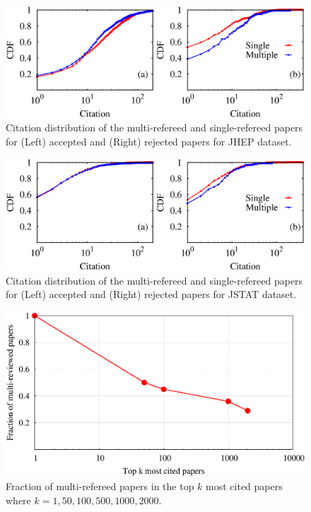 \begin{figure}
 \centering
 \includegraphics[scale = 0.26]{figures/citation_jhep_1.eps}
 \caption{\label{citation:jhep} Citation distribution of the multi-refereed and single-refereed papers for (Left) accepted and (Right) rejected papers for JHEP dataset.\vspace{-4mm}} 
\end{figure}

\begin{figure}
 \centering
 \includegraphics[scale = 0.26]{figures/citation_jstat_1.eps}
 \caption{\label{citation:jstat} Citation distribution of the multi-refereed and single-refereed papers for (Left) accepted and (Right) rejected papers for JSTAT dataset.\vspace{-2mm}}
\end{figure}

\begin{figure}
 \centering
 \includegraphics[scale = 0.26]{figures/best_paper.eps}
 \caption{\label{fig:best} Fraction of multi-refereed papers in the top $k$ most cited papers where $k = 1,50,100,500,1000,2000$.\vspace{-4mm}}
\end{figure}

